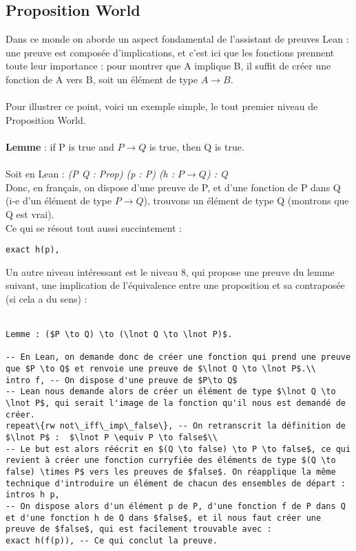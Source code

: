 \subsection{Proposition World}
Dans ce monde on aborde un aspect fondamental de l'assistant de preuves Lean : une preuve est composée d'implications, et c'est ici que les fonctions prennent toute leur importance : pour montrer que A implique B, il suffit de créer une fonction de A vers B, soit un élément de type $A \to B$.\\
\\
Pour illustrer ce point, voici un exemple simple, le tout premier niveau de Proposition World. \\ \\
\textbf{Lemme} : if P is true and $P \to Q$ is true, then Q is true. \\ \\
Soit en Lean : \textit{(P Q : Prop) (p : P) (h : $P \to Q$) : Q} \\
Donc, en français, on dispose d'une preuve de P, et d'une fonction de P dans Q (i-e d'un élément de type $P \to Q$), trouvons un élément de type Q (montrons que Q est vrai). \\
Ce qui se résout tout aussi succintement : \\
\begin{verbatim} 
exact h(p), 
\end{verbatim}
Un autre niveau intéressant est le niveau 8, qui propose une preuve du lemme suivant, une implication de l'équivalence entre une proposition et sa contraposée (si cela a du sens) : \\
\\
\begin{verbatim}
Lemme : ($P \to Q) \to (\lnot Q \to \lnot P)$. 

-- En Lean, on demande donc de créer une fonction qui prend une preuve que $P \to Q$ et renvoie une preuve de $\lnot Q \to \lnot P$.\\
intro f, -- On dispose d'une preuve de $P\to Q$ 
-- Lean nous demande alors de créer un élément de type $\lnot Q \to \lnot P$, qui serait l'image de la fonction qu'il nous est demandé de créer.
repeat\{rw not\_iff\_imp\_false\}, -- On retranscrit la définition de $\lnot P$ :  $\lnot P \equiv P \to false$\\
-- Le but est alors réécrit en $(Q \to false) \to P \to false$, ce qui revient à créer une fonction curryfiée des éléments de type $(Q \to false) \times P$ vers les preuves de $false$. On réapplique la même technique d'introduire un élément de chacun des ensembles de départ : 
intros h p,
-- On dispose alors d'un élément p de P, d'une fonction f de P dans Q et d'une fonction h de Q dans $false$, et il nous faut créer une preuve de $false$, qui est facilement trouvable avec : 
exact h(f(p)), -- Ce qui conclut la preuve. 
\end{verbatim}



